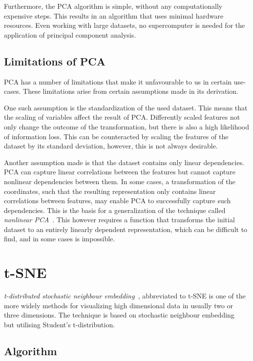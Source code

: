 Furthermore, the PCA algorithm is simple, without any computationally expensive steps. This results in an algorithm that uses minimal hardware resources. Even working with large datasets, no supercomputer is needed for the application of principal component analysis.

\subsection{Limitations of PCA}\label{subsec:limitations-of-pca}


PCA has a number of limitations that make it unfavourable to us in certain use-cases. These limitations arise from certain assumptions made in its derivation.

One such assumption is the standardization of the used dataset. This means that the scaling of variables affect the result of PCA. Differently scaled features not only change the outcome of the transformation, but there is also a high likelihood of information loss. This can be counteracted by scaling the features of the dataset by its standard deviation, however, this is not always desirable.

Another assumption made is that the dataset contains only linear dependencies. PCA can capture linear correlations between the features but cannot capture nonlinear dependencies between them. In some cases, a transformation of the coordinates, such that the resulting representation only contains linear correlations between features, may enable PCA to successfully capture such dependencies. This is the basis for a generalization of the technique called \textit{nonlinear PCA}~\cite{bib:nonlinpca}. This however requires a function that transforms the initial dataset to an entirely linearly dependent representation, which can be difficult to find, and in some cases is impossible.

\section{t-SNE}\label{sec:t-sne}

\textit{t-distributed stochastic neighbour embedding}~\cite{bib:tsne}, abbreviated to t-SNE is one of the more widely methods for visualizing high dimensional data in usually two or three dimensions. The technique is based on stochastic neighbour embedding~\cite{bib:sne} but utilising Student's t-distribution.

\subsection{Algorithm}

